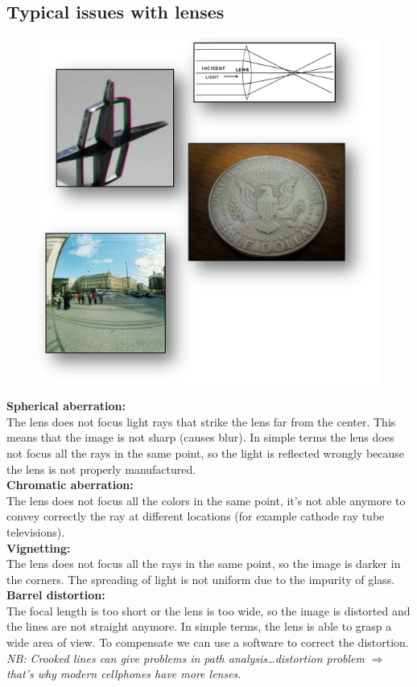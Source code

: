 \subsection{Typical issues with lenses}

\begin{figure}
    \includegraphics[scale=0.4]{Figures/ops.png}
\end{figure}

\textbf{Spherical aberration:} 
\\The lens does not focus light rays that strike the lens far from the center. This means that the image is not sharp (causes blur).
In simple terms the lens does not focus all the rays in the same point, so the light is reflected wrongly because the lens is not properly manufactured.
\\\textbf{Chromatic aberration:}
\\The lens does not focus all the colors in the same point, it's not able anymore to convey correctly the ray at different locations (for example cathode ray tube televisions).
\\\textbf{Vignetting:}
\\The lens does not focus all the rays in the same point, so the image is darker in the corners. The spreading of light is not uniform due to the impurity of glass.
\\\textbf{Barrel distortion:}
\\The focal length is too short or the lens is too wide, so the image is distorted and the lines are not straight anymore.
In simple terms, the lens is able to grasp a wide area of view. To compensate we can use a software to correct the distortion. 
\textit{NB: Crooked lines can give problems in path analysis\dots distortion problem $\Rightarrow$ that's why modern cellphones have more lenses.}
